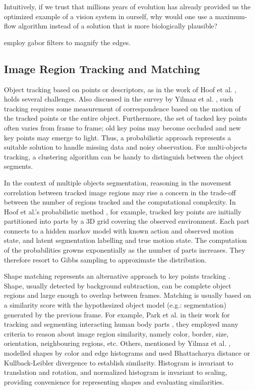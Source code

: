 \documentclass{article}
\begin{document}
Intuitively, if we trust that millions years of evolution has already provided us the optimized example of a vision system in ourself, why would one use a maximum-flow algorithm instead of a solution that is more biologically plausible?

employ gabor filters \cite{gabor} to magnify the edges. 


\subsection{Image Region Tracking and Matching}

Object tracking based on points or descriptors, as in the work of Hoof et al. \cite{herke}, holds several challenges. Also discussed in the survey by Yilmaz et al. \cite{tracking}, such tracking requires some measurement of correspondence based on the motion of the tracked points or the entire object. Furthermore, the set of tacked key points often varies from frame to frame; old key poins may become occluded and new key points may emerge to light. Thus, a probabilistic approach represents a suitable solution to handle missing data and noisy observation. For multi-objects tracking, a clustering algorithm can be handy to distinguish between the object segments. 

In the context of multiple objects segmentation, reasoning in the movement correlation between tracked image regions may rise a concern in the trade-off between the number of regions tracked and the computational complexity. In Hoof et al.'s probabilistic method \cite{herke}, for example, tracked key points are initially partitioned into parts by a 3D grid covering the observed environment. Each part connects to a hidden markov model with known action and observed motion state, and latent segmentation labelling and true motion state. The computation of the probabilities growns exponentially as the number of parts increases. They therefore resort to Gibbs sampling to approximate the distribution. 

Shape matching represents an alternative approach to key points tracking \cite{tracking}. Shape, usually detected by background subtraction, can be complete object regions and large enough to overlap between frames. Matching is usually based on a similarity score with the hypothesized object model (e.g.: segmentation) generated by the previous frame. For example, Park et al. in their work for tracking and segmenting interacting human body parts \cite{human-action}, they employed many criteria to reason about image region similarity, namely color, border, size, orientation, neighbouring regions, etc. Others, mentioned by Yilmaz et al. \cite{tracking}, modelled shapes by color and edge histograms and used Bhattacharya distance or Kullback-Leibler divergence to establish similarity. Histogram is invariant to translation and rotation, and normalized histogram is invariant to scaling, providing convenience for representing shapes and evaluating similarities.
\end{document}
